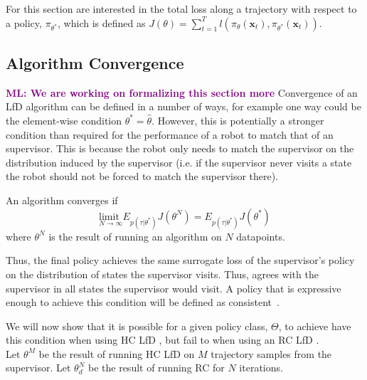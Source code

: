 \documentclass[10pt, conference]{ieeeconf}      %
\newcommand{\bx}{\mathbf{x}}
\newcommand{\ns}{HC LfD }
\newcommand{\nc}{RC LfD }
\newcommand{\mlnote}[1]{\ifthenelse{ \boolean{include-notes}}%
 {\textcolor{purple}{\textbf{ML: #1}}}{}}
\begin{document}
For this section are interested in the total loss along a trajectory with respect to a policy, $\pi_{\theta^*}$, which is defined as $J(\theta) = \sum^T_{t=1} l(\pi_{\theta}(\bx_{t}),\pi_{\theta^*}(\bx_{t}))$. 

\subsection{Algorithm Convergence}
\mlnote{We are working on formalizing this section more}
Convergence of an LfD algorithm can be defined in a number of ways, for example one way could be the element-wise condition $\theta^* = \hat{\theta}$. However, this is potentially a stronger condition than required for the performance of a robot to match that of an supervisor.  This is because the robot only needs to match the supervisor on the distribution induced by the supervisor (i.e. if the supervisor never visits a state the robot should not be forced to match the supervisor there). 

An algorithm converges if
$$\underset{N \rightarrow \infty}{\text{limit }} E_{p(\tau|\theta^*)}J(\theta^N)  = E_{p(\tau|\theta^*)}J(\theta^*) $$
\noindent where $\theta^N$ is the result of running an algorithm on $N$ datapoints.

Thus, the final policy achieves the same surrogate loss of the supervisor's policy on the distribution of states the supervisor visits. Thus, agrees with the supervisor in all states the supervisor would visit.  A policy that is expressive enough to achieve this condition will be defined as consistent~\cite{vapnik1992principles}.

We will now show that it is possible for a given policy class, $\Theta$, to achieve have this condition when using \ns , but fail to when using an \nc. \\
Let $\theta^M$ be the result of running \ns on $M$ trajectory samples from the supervisor.
Let $\theta_{d}^N$ be the result of running RC for $N$ iterations.
\end{document}
